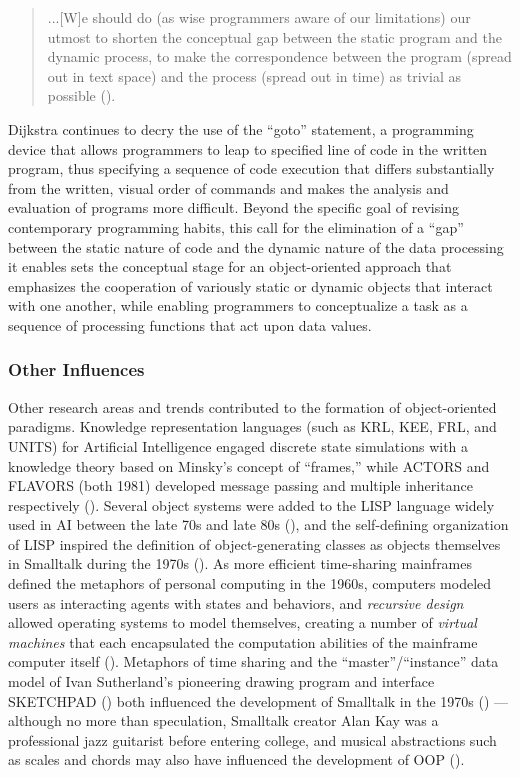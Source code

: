 \begin{quote}
...[W]e should do (as wise programmers aware of our limitations) our utmost to shorten the conceptual gap between the static program and the dynamic process, to make the correspondence between the program (spread out in text space) and the process (spread out in time) as trivial as possible (\cite{Dijkstra:1968ul}).
\end{quote}

Dijkstra continues to decry the use of the ``goto'' statement, a programming device that allows programmers to leap to specified line of code in the written program, thus specifying a sequence of code execution that differs substantially from the written, visual order of commands and makes the analysis and evaluation of programs more difficult. Beyond the specific goal of revising contemporary programming habits, this call for the elimination of a ``gap'' between the static nature of code and the dynamic nature of the data processing it enables sets the conceptual stage for an object-oriented approach that emphasizes the cooperation of variously static or dynamic objects that interact with one another, while enabling programmers to conceptualize a task as a sequence of processing functions that act upon data values.

\subsubsection{Other Influences}
Other research areas and trends contributed to the formation of object-oriented paradigms. Knowledge representation languages (such as KRL, KEE, FRL, and UNITS) for Artificial Intelligence engaged discrete state simulations with a knowledge theory based on Minsky's concept of ``frames,'' while ACTORS and FLAVORS (both 1981) developed message passing and multiple inheritance respectively (\cite{stefik1985object}). Several object systems were added to the LISP language widely used in AI between the late 70s and late 80s (\cite{Bobrow:1986qf}), and the self-defining organization of LISP inspired the definition of object-generating classes as objects themselves in Smalltalk during the 1970s (\cite[575]{Kay:1996vn}). As more efficient time-sharing mainframes defined the metaphors of personal computing in the 1960s, computers modeled users as interacting agents with states and behaviors, and \emph{recursive design} allowed operating systems to model themselves, creating a number of \emph{virtual machines} that each encapsulated the computation abilities of the mainframe computer itself (\cite{Creasy:1981ys}).  Metaphors of time sharing and the ``master''/``instance'' data model of Ivan Sutherland's pioneering drawing program and interface SKETCHPAD (\cite{Sutherland:1964zr}) both influenced the development of Smalltalk in the 1970s (\cite[575]{Kay:1996vn}) --- although no more than speculation, Smalltalk creator Alan Kay was a professional jazz guitarist before entering college, and musical abstractions such as scales and chords may also have influenced the development of OOP (\cite[579]{Kay:1996vn}).

